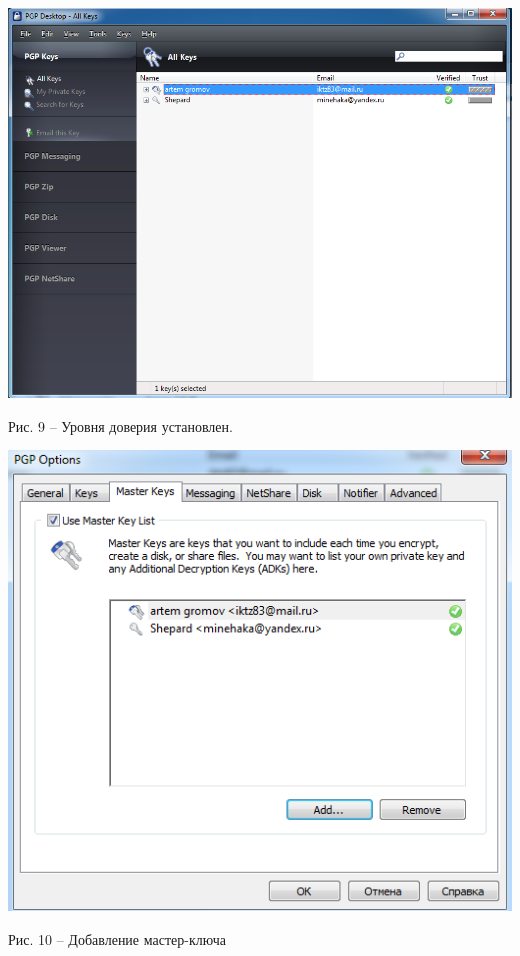 \documentclass[a4paper,14pt]{extarticle}
\begin{document}
    \begin{center}
        \includegraphics[scale=0.45]{pics/9.png}

        Рис. 9 – Уровня доверия установлен.
    \end{center}
    \begin{center}
        \includegraphics[scale=0.55]{pics/10.png}

        Рис. 10 – Добавление мастер-ключа
    \end{center}
\end{document}
